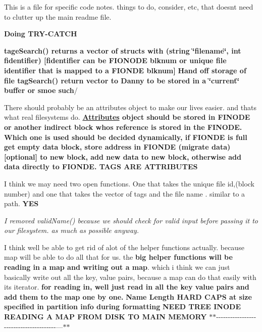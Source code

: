 This is a file for specific code notes. things to do, consider, etc, that doesn\textquotesingle{}t need to clutter up the main readme file.

{\bfseries Doing T\+R\+Y-\/\+C\+A\+T\+CH}

{\bfseries tage\+Search() returns a vector of structs with (string \char`\"{}filename\char`\"{}, int fidentifier) \mbox{[}fidentifier can be F\+I\+O\+N\+O\+DE blknum or unique file identifier that is mapped to a F\+I\+O\+N\+DE blknum\mbox{]}} {\bfseries Hand off storage of file tag\+Search() return vector to Danny to be stored in a \char`\"{}current\char`\"{} buffer or smoe such}/

There should probably be an attributes object to make our lives easier. and thats what real filesystems do. {\bfseries \mbox{\hyperlink{classAttributes}{Attributes}} object should be stored in F\+I\+N\+O\+DE or another indirect block who\textquotesingle{}s reference is stored in the F\+I\+N\+O\+DE. Which one is used should be decided dynamically, if F\+I\+O\+N\+DE is full get empty data block, store address in F\+I\+O\+N\+DE (migrate data)\mbox{[}optional\mbox{]} to new block, add new data to new block, otherwise add data directly to F\+I\+O\+N\+DE. T\+A\+GS A\+RE A\+T\+T\+R\+I\+B\+U\+T\+ES}

I think we may need two open functions. One that takes the unique file id,(block number) and one that takes the vector of tags and the file name . similar to a path. {\bfseries Y\+ES}

{\itshape I removed valid\+Name() because we should check for valid input before passing it to our filesystem. as much as possible anyway.}

I think we\textquotesingle{}ll be able to get rid of alot of the helper functions actually. because map will be able to do all that for us. the {\bfseries big helper functions will be reading in a map and writing out a map}. which i think we can just basically write out all the key, value pairs, because a map can do that easily with its iterator. {\bfseries for reading in, we\textquotesingle{}ll just read in all the key value pairs and add them to the map one by one.} {\bfseries Name Length H\+A\+RD C\+A\+PS at size specified in partition info during formatting} {\bfseries N\+E\+ED T\+R\+EE I\+N\+O\+DE} {\bfseries R\+E\+A\+D\+I\+NG A M\+AP F\+R\+OM D\+I\+SK TO M\+A\+IN M\+E\+M\+O\+RY} $\ast$$\ast$-\/-\/-\/-\/-\/-\/-\/-\/-\/-\/-\/-\/-\/-\/-\/-\/-\/-\/-\/-\/-\/-\/-\/-\/-\/-\/-\/-\/-\/-\/-\/-\/-\/-\/-\/-\/-\/-\/-\/---$\ast$$\ast$

